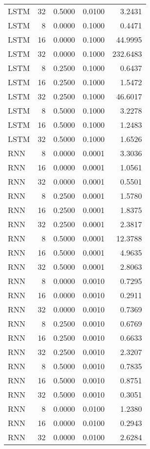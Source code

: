 \begin{table}[h!]
\begin{adjustbox}{max width=\textwidth}
\begin{tabular}{lrrrr}
  LSTM &    32 & 0.5000 & 0.0100 & 3.2431 \\ 
  LSTM &     8 & 0.0000 & 0.1000 & 0.4471 \\ 
  LSTM &    16 & 0.0000 & 0.1000 & 44.9995 \\ 
  LSTM &    32 & 0.0000 & 0.1000 & 232.6483 \\ 
  LSTM &     8 & 0.2500 & 0.1000 & 0.6437 \\ 
  LSTM &    16 & 0.2500 & 0.1000 & 1.5472 \\ 
  LSTM &    32 & 0.2500 & 0.1000 & 46.6017 \\ 
  LSTM &     8 & 0.5000 & 0.1000 & 3.2278 \\ 
  LSTM &    16 & 0.5000 & 0.1000 & 1.2483 \\ 
  LSTM &    32 & 0.5000 & 0.1000 & 1.6526 \\ 
  RNN &     8 & 0.0000 & 0.0001 & 3.3036 \\ 
  RNN &    16 & 0.0000 & 0.0001 & 1.0561 \\ 
  RNN &    32 & 0.0000 & 0.0001 & 0.5501 \\ 
  RNN &     8 & 0.2500 & 0.0001 & 1.5780 \\ 
  RNN &    16 & 0.2500 & 0.0001 & 1.8375 \\ 
  RNN &    32 & 0.2500 & 0.0001 & 2.3817 \\ 
  RNN &     8 & 0.5000 & 0.0001 & 12.3788 \\ 
  RNN &    16 & 0.5000 & 0.0001 & 4.9635 \\ 
  RNN &    32 & 0.5000 & 0.0001 & 2.8063 \\ 
  RNN &     8 & 0.0000 & 0.0010 & 0.7295 \\ 
  RNN &    16 & 0.0000 & 0.0010 & 0.2911 \\ 
  RNN &    32 & 0.0000 & 0.0010 & 0.7369 \\ 
  RNN &     8 & 0.2500 & 0.0010 & 0.6769 \\ 
  RNN &    16 & 0.2500 & 0.0010 & 0.6633 \\ 
  RNN &    32 & 0.2500 & 0.0010 & 2.3207 \\ 
  RNN &     8 & 0.5000 & 0.0010 & 0.7835 \\ 
  RNN &    16 & 0.5000 & 0.0010 & 0.8751 \\ 
  RNN &    32 & 0.5000 & 0.0010 & 0.3051 \\ 
  RNN &     8 & 0.0000 & 0.0100 & 1.2380 \\ 
  RNN &    16 & 0.0000 & 0.0100 & 0.2943 \\ 
  RNN &    32 & 0.0000 & 0.0100 & 2.6284 \\ 

\end{tabular}
\end{adjustbox}
\end{table}

